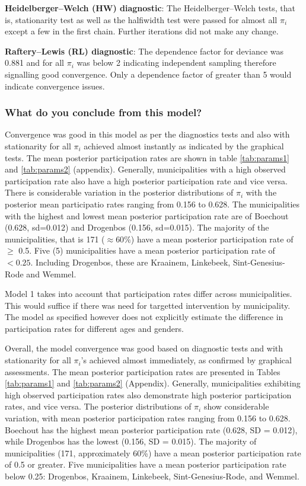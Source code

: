\documentclass[12pt]{article}
\begin{document}
\textbf{Heidelberger–Welch (HW) diagnostic}: The Heidelberger–Welch tests, that is, stationarity test as well as the halfiwidth test were passed for almost all $\pi_i$ except a few in the first chain. Further iterations did not make any change.

\textbf{Raftery–Lewis (RL) diagnostic}: The dependence factor for deviance was 0.881 and for all $\pi_i$ was below 2 indicating independent sampling therefore signalling good convergence. Only a dependence factor of greater than 5 would indicate convergence issues.


\subsubsection{What do you conclude from this model?}

Convergence was good in this model as per the diagnostics tests and also with stationarity for all $\pi_i$ achieved almost instantly as indicated by the graphical tests. 
The mean posterior participation rates are shown in table \ref{tab:params1} and \ref{tab:params2} (appendix). Generally, municipalities with a high observed participation rate also have a high posterior participation rate and vice versa. There is considerable variation in the posterior distributions of $\pi_i$ with the posterior mean participatio rates ranging from 0.156 to 0.628. The municipalities with the highest and lowest mean posterior participation rate are of Boechout (0.628, sd=0.012) and Drogenbos (0.156, sd=0.015). The majority of the municipalities, that is 171 ($\approx 60\%$) have a mean posterior participation rate of $\geq$ 0.5. Five (5) municipalities have a mean posterior participation rate of $<0.25$. Including Drogenbos, these are Kraainem, Linkebeek, Sint-Genesius-Rode and Wemmel.

Model 1 takes into account that participation rates differ across municipalities. This would suffice if there was need for targetted intervention by municipality. The model as specified however does not explicitly estimate the difference in participation rates for different ages and genders.

Overall, the model convergence was good based on diagnostic tests and with stationarity for all  $\pi_i$'s achieved almost immediately, as confirmed by graphical assessments.
The mean posterior participation rates are presented in Tables \ref{tab:params1} and \ref{tab:params2} (Appendix). Generally, municipalities exhibiting high observed participation rates also demonstrate high posterior participation rates, and vice versa. The posterior distributions of $\pi_i$ show considerable variation, with mean posterior participation rates ranging from 0.156 to 0.628. Boechout has the highest mean posterior participation rate (0.628, SD = 0.012), while Drogenbos has the lowest (0.156, SD = 0.015). The majority of municipalities (171, approximately 60\%) have a mean posterior participation rate of 0.5 or greater. Five municipalities have a mean posterior participation rate below 0.25: Drogenbos, Kraainem, Linkebeek, Sint-Genesius-Rode, and Wemmel.
\end{document}
